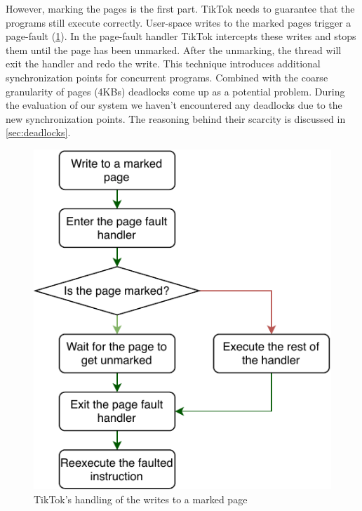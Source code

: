 However, marking the pages is the first part. TikTok needs to guarantee that the
programs still execute correctly. User-space writes to the marked pages trigger
a page-fault (\cref{fig:pagefault}). In the page-fault handler TikTok intercepts
these writes and stops them until the page has been unmarked. After the
unmarking, the thread will exit the handler and redo the write. This technique
introduces additional synchronization points for concurrent programs. Combined
with the coarse granularity of pages (4KBs) deadlocks come up as a potential
problem. During the evaluation of our system we haven't encountered any
deadlocks due to the new synchronization points. The reasoning behind their
scarcity is discussed in \cref{sec:deadlocks}.

\begin{figure}[]
  \centering
  \includegraphics[width = .75 \linewidth]{img/pagefault.pdf}
  \caption{TikTok's handling of the writes to a marked page}
  \label{fig:pagefault}
\end{figure}

